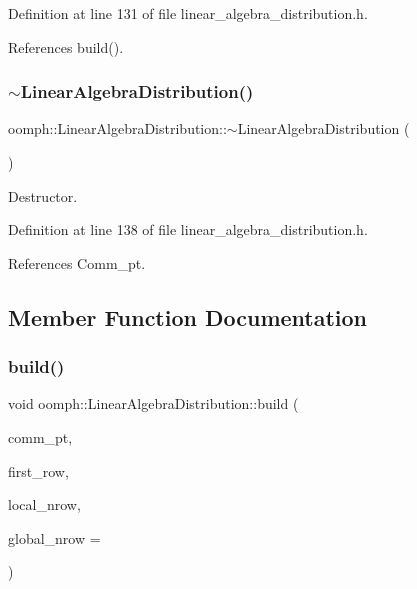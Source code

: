 Definition at line 131 of file linear\+\_\+algebra\+\_\+distribution.\+h.



References build().

\mbox{\label{classoomph_1_1LinearAlgebraDistribution_a3d4a398895bcdd1a66493ac555cd6dee}} 
\subsubsection{\texorpdfstring{$\sim$\+Linear\+Algebra\+Distribution()}{~LinearAlgebraDistribution()}}
{\footnotesize\ttfamily oomph\+::\+Linear\+Algebra\+Distribution\+::$\sim$\+Linear\+Algebra\+Distribution (\begin{DoxyParamCaption}{ }\end{DoxyParamCaption})\hspace{0.3cm}{\ttfamily [inline]}}



Destructor. 



Definition at line 138 of file linear\+\_\+algebra\+\_\+distribution.\+h.



References Comm\+\_\+pt.



\subsection{Member Function Documentation}
\mbox{\label{classoomph_1_1LinearAlgebraDistribution_a3cab441019e738e4c6db6ee22dd71515}} 
\subsubsection{\texorpdfstring{build()}{build()}\hspace{0.1cm}{\footnotesize\ttfamily [1/4]}}
{\footnotesize\ttfamily void oomph\+::\+Linear\+Algebra\+Distribution\+::build (\begin{DoxyParamCaption}\item[{const \hyperlink{classoomph_1_1OomphCommunicator}{Oomph\+Communicator} $\ast$const}]{comm\+\_\+pt,  }\item[{const unsigned \&}]{first\+\_\+row,  }\item[{const unsigned \&}]{local\+\_\+nrow,  }\item[{const unsigned \&}]{global\+\_\+nrow = {} }\end{DoxyParamCaption})}



